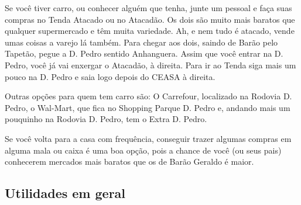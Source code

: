 Se você tiver carro, ou conhecer alguém que tenha, junte um pessoal e faça suas
compras no Tenda Atacado ou no Atacadão. Os dois são muito mais baratos que
qualquer supermercado e têm muita variedade. Ah, e nem tudo é atacado, vende
umas coisas a varejo lá também. Para chegar aos dois, saindo de Barão pelo
Tapetão, pegue a D. Pedro sentido Anhanguera. Assim que você entrar na D.
Pedro, você já vai enxergar o Atacadão, à direita. Para ir ao Tenda siga mais
um pouco na D. Pedro e saia logo depois do CEASA à direita.

Outras opções para quem tem carro são: O Carrefour, localizado na Rodovia D.
Pedro, o Wal-Mart, que fica no Shopping Parque D. Pedro e, andando mais um
pouquinho na Rodovia D. Pedro, tem o Extra D. Pedro.

Se você volta para a casa com frequência, conseguir trazer algumas compras em
alguma mala ou caixa é uma boa opção, pois a chance de você (ou seus pais)
conhecerem mercados mais baratos que os de Barão Geraldo é maior.

\subsection{Utilidades em geral}

